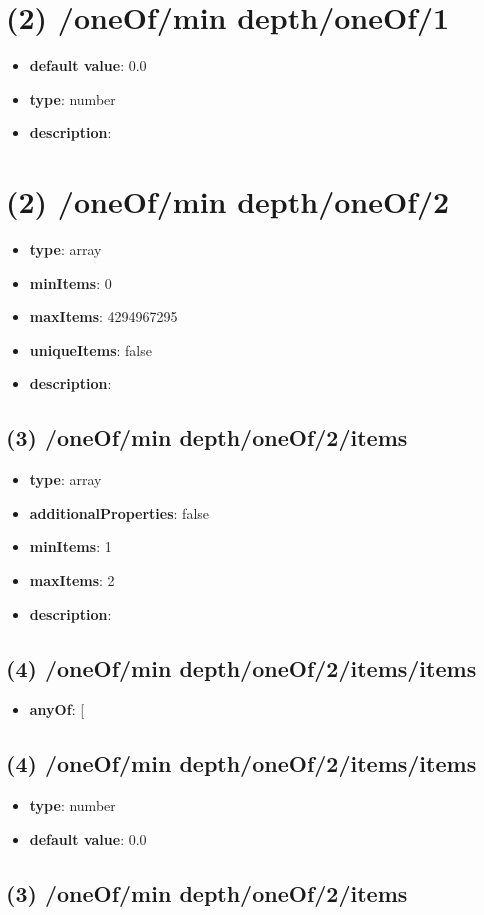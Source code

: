 \section{(2) /oneOf/min depth/oneOf/1}
\begin{itemize}[leftmargin=2em]\item {\bf default value}: 0.0
\item {\bf type}: number
\item {\bf description}: 
\end{itemize}\section{(2) /oneOf/min depth/oneOf/2}
\begin{itemize}[leftmargin=2em]\item {\bf type}: array
\item {\bf minItems}: 0
\item {\bf maxItems}: 4294967295
\item {\bf uniqueItems}: false
\item {\bf description}: 
\end{itemize}\subsection{(3) /oneOf/min depth/oneOf/2/items}
\begin{itemize}[leftmargin=3em]\item {\bf type}: array
\item {\bf additionalProperties}: false
\item {\bf minItems}: 1
\item {\bf maxItems}: 2
\item {\bf description}: 
\end{itemize}\subsection{(4) /oneOf/min depth/oneOf/2/items/items}
\begin{itemize}[leftmargin=4em]\item {\bf anyOf}: [\end{itemize}\subsection{(4) /oneOf/min depth/oneOf/2/items/items}
\begin{itemize}[leftmargin=4em]\item {\bf type}: number\item {\bf default value}: 0.0
\end{itemize}\subsection{(3) /oneOf/min depth/oneOf/2/items}
